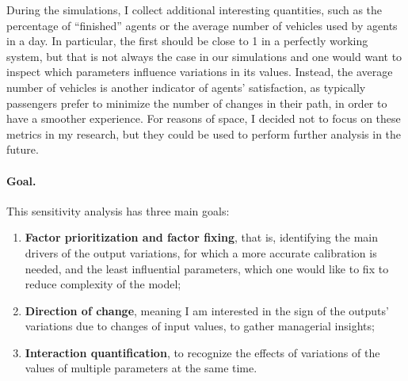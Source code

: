 During the simulations, I collect additional interesting quantities, such as the percentage of “finished” agents or the average number of vehicles used by agents in a day. In particular, the first should be close to 1 in a perfectly working system, but that is not always the case in our simulations and one would want to inspect which parameters influence variations in its values. Instead, the average number of vehicles is another indicator of agents' satisfaction, as typically passengers prefer to minimize the number of changes in their path, in order to have a smoother experience. For reasons of space, I decided not to focus on these metrics in my research, but they could be used to perform further analysis in the future.


\paragraph{Goal.}
This sensitivity analysis has three main goals:
\begin{enumerate}
    \item \textbf{Factor prioritization and factor fixing}, that is, identifying the main drivers of the output variations, for which a more accurate calibration is needed, and the least influential parameters, which one would like to fix to reduce complexity of the model;
    \item \textbf{Direction of change}, meaning I am interested in the sign of the outputs' variations due to changes of input values, to gather managerial insights;
    \item \textbf{Interaction quantification}, to recognize the effects of variations of the values of multiple parameters at the same time. 
\end{enumerate}


